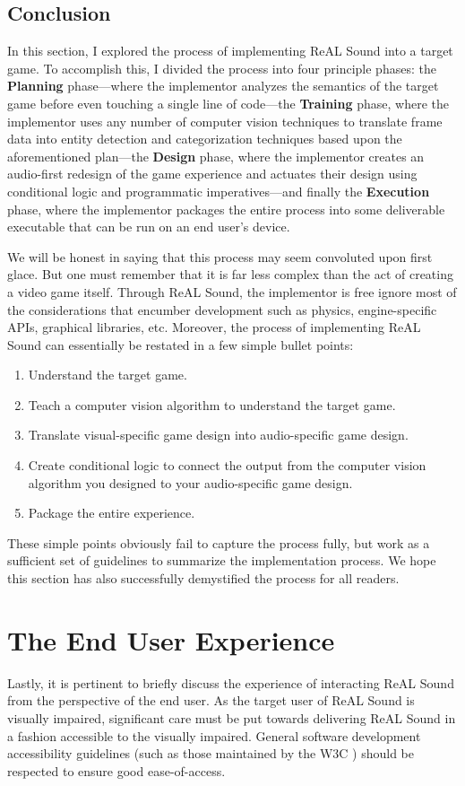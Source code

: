 \documentclass{report}
\newcommand{\rs}{ReAL Sound\xspace}
\newcommand{\plan}{\textbf{Planning}\xspace}
\newcommand{\train}{\textbf{Training}\xspace}
\newcommand{\design}{\textbf{Design}\xspace}
\newcommand{\exec}{\textbf{Execution}\xspace}
\newcommand{\imp}{implementor\xspace}
\begin{document}
\subsection{Conclusion}

In this section, I explored the process of implementing \rs into a target game. To accomplish this, I divided the process into four principle phases: the \plan phase---where the \imp analyzes the semantics of the target game before even touching a single line of code---the \train phase, where the \imp uses any number of computer vision techniques to translate frame data into entity detection and categorization techniques based upon the aforementioned plan---the \design phase, where the \imp creates an audio-first redesign of the game experience and actuates their design using conditional logic and programmatic imperatives---and finally the \exec phase, where the \imp packages the entire process into some deliverable executable that can be run on an end user's device. 

We will be honest in saying that this process may seem convoluted upon first glace. But one must remember that it is far less complex than the act of creating a video game itself. Through \rs, the implementor is free ignore most of the considerations that encumber development such as physics, engine-specific APIs, graphical libraries, etc. Moreover, the process of implementing \rs can essentially be restated in a few simple bullet points:


\begin{enumerate}
    \item Understand the target game.
    \item Teach a computer vision algorithm to understand the target game.
    \item Translate visual-specific game design into audio-specific game design.
    \item Create conditional logic to connect the output from the computer vision algorithm you designed to your audio-specific game design. 
    \item Package the entire experience.
\end{enumerate}

These simple points obviously fail to capture the process fully, but work as a sufficient set of guidelines to summarize the implementation process. We hope this section has also successfully demystified the process for all readers.

\section{The End User Experience}
Lastly, it is pertinent to briefly discuss the experience of interacting \rs from the perspective of the end user. As the target user of \rs is visually impaired, significant care must be put towards delivering \rs in a fashion accessible to the visually impaired. General software development accessibility guidelines (such as those maintained by the W3C \cite{Spellman:24:WAG}) should be respected to ensure good ease-of-access. 
\end{document}
